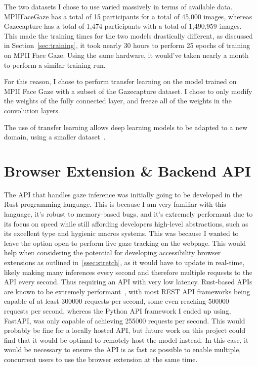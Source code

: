 \documentclass{report}
\begin{document}
The two datasets I chose to use varied massively in terms of available data. MPIIFaceGaze has a total of 15 participants for a total of 45,000 images, whereas Gazecapture has a total of 1,474 participants with a total of 1,490,959 images. This made the training times for the two models drastically different, as discussed in Section~\ref{sec:training}, it took nearly 30 hours to perform 25 epochs of training on MPII Face Gaze. Using the same hardware, it would've taken nearly a month to perform a similar training run. 

For this reason, I chose to perform transfer learning on the model trained on MPII Face Gaze with a subset of the Gazecapture dataset. I chose to only modify the weights of the fully connected layer, and freeze all of the weights in the convolution layers. 

The use of transfer learning allows deep learning models to be adapted to a new domain, using a smaller dataset~\cite{koehrsen2018transfer}. 


\section{Browser Extension \& Backend API}

The API that handles gaze inference was initially going to be developed in the Rust programming language. This is because I am very familiar with this language, it's robust to memory-based bugs, and it's extremely performant due to its focus on speed while still affording developers high-level abstractions, such as its excellent type and hygienic macros systems. This was because I wanted to leave the option open to perform live gaze tracking on the webpage. This would help when considering the potential for developing accessibility browser extensions as outlined in~\autoref{ssec:stretch}, as it would have to update in real-time, likely making many inferences every second and therefore multiple requests to the API every second. Thus requiring an API with very low latency. Rust-based APIs are known to be extremely performant~\cite{ali2020benchmark}, with most REST API frameworks being capable of at least 300000 requests per second, some even reaching 500000 requests per second, whereas the Python API framework I ended up using, FastAPI, was only capable of achieving 255000 requests per second. This would probably be fine for a locally hosted API, but future work on this project could find that it would be optimal to remotely host the model instead. In this case, it would be necessary to ensure the API is as fast as possible to enable multiple, concurrent users to use the browser extension at the same time. 
\end{document}
